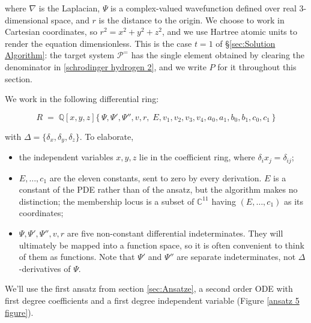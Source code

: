 \documentclass{article}
\theoremstyle{definition}
\theoremstyle{plain}
\newif\ifNSexample
\begin{document}
where $\nabla$ is the Laplacian, $\Psi$ is a complex-valued wavefunction defined over real 3-dimensional space,
and $r$ is the distance to the origin.  We choose to work in Cartesian coordinates, so $r^2=x^2+y^2+z^2$,
and we use Hartree atomic units to render the equation dimensionless.
This is the case $t = 1$ of \S\ref{sec:Solution Algorithm}: the target system
$\mathcal{P}^=$ has the single element obtained by clearing the denominator in
\eqref{schrodinger hydrogen 2}, and we write $P$ for it throughout this section.
\ifNSexample
The Navier--Stokes example of \S\ref{sec:NavierStokes} exercises the general
case.
\fi

We work in the following differential ring:

\begin{equation}
\label{eq:hydrogen-ring}
R \;=\; \mathbb{Q}[x,y,z]\{\,\Psi, \Psi', \Psi'', v, r,\;
   E, v_1, v_2, v_3, v_4, a_0, a_1, b_0, b_1, c_0, c_1 \,\}
\end{equation}

\noindent
with $\Delta = \{\delta_x, \delta_y, \delta_z\}$.  To elaborate,
\begin{itemize}
   \item the independent variables $x, y, z$ lie in the coefficient ring, where
   $\delta_i x_j = \delta_{ij}$;
   \item $E, \ldots, c_1$ are the eleven constants, sent to zero by every
   derivation.  $E$ is a constant of the PDE rather than of the ansatz, but the
   algorithm makes no distinction; the membership locus is a subset of $\mathbb{C}^{11}$ having $(E,\ldots,c_1)$
   as its coordinates;
   \item $\Psi, \Psi', \Psi'', v, r$ are five non-constant differential
   indeterminates.  They will ultimately be mapped into a function space, so it
   is often convenient to think of them as functions.  Note that $\Psi'$ and
   $\Psi''$ are separate indeterminates, not $\Delta$-derivatives of $\Psi$.
\end{itemize}


We'll use the first ansatz from section \ref{sec:Ansatze},
a second order ODE with first degree coefficients and a first degree independent variable
(Figure \ref{ansatz 5 figure}).
\end{document}
